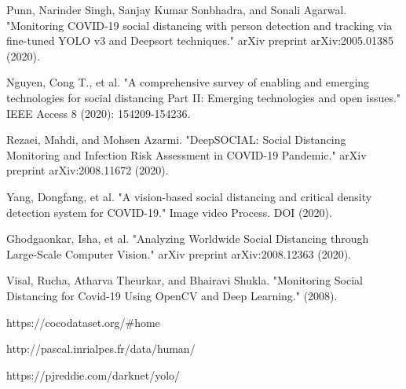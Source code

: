 \documentclass[runningheads,a4paper,11pt]{report}
\begin{document}

\begin{thebibliography}{1}
    Punn, Narinder Singh, Sanjay Kumar Sonbhadra, and Sonali Agarwal. "Monitoring COVID-19 social distancing with person detection and tracking via fine-tuned YOLO v3 and Deepsort techniques." arXiv preprint arXiv:2005.01385 (2020).
    
     Nguyen, Cong T., et al. "A comprehensive survey of enabling and emerging technologies for social distancing Part II: Emerging technologies and open issues." IEEE Access 8 (2020): 154209-154236.
    
    Rezaei, Mahdi, and Mohsen Azarmi. "DeepSOCIAL: Social Distancing Monitoring and Infection Risk Assessment in COVID-19 Pandemic." arXiv preprint arXiv:2008.11672 (2020).
    
     Yang, Dongfang, et al. "A vision-based social distancing and critical density detection system for COVID-19." Image video Process. DOI (2020).
    
     Ghodgaonkar, Isha, et al. "Analyzing Worldwide Social Distancing through Large-Scale Computer Vision." arXiv preprint arXiv:2008.12363 (2020).

     Visal, Rucha, Atharva Theurkar, and Bhairavi Shukla. "Monitoring Social Distancing for Covid-19 Using OpenCV and Deep Learning." (2008).
    
     https://cocodataset.org/\#home
    
     http://pascal.inrialpes.fr/data/human/
    
     https://pjreddie.com/darknet/yolo/
    
\end{thebibliography}
\end{document}
